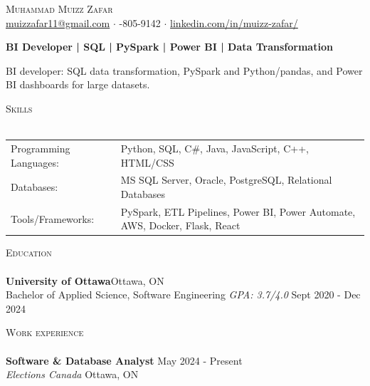 \documentclass[a4paper]{article}
\newcommand{\lineunder} {
    \vspace*{-8pt} \\
    \hspace*{-18pt} \hrulefill \\
}
\newcommand{\header} [1] {
    {\hspace*{-18pt}\vspace*{6pt} \textsc{#1}}
    \vspace*{-6pt} \lineunder
}
\begin{document}
\vspace*{-40pt}
\vspace*{-10pt}
\begin{center}
	{\Huge \scshape {Muhammad Muizz Zafar}}\\
	\faSend \space \href{mailto:muizzafar11@gmail.com}{muizzafar11@gmail.com} $\cdot$ \faPhoneSquare {}-805-9142 $\cdot$ \faLinkedinSquare \space \href{https://www.linkedin.com/in/muizz-zafar/}{linkedin.com/in/muizz-zafar/}
	\\
\end{center}
\vspace{-5pt}
\begin{center}
\textbf{BI Developer | SQL | PySpark | Power BI | Data Transformation}
\end{center}
\begin{center}
BI developer: SQL data transformation, PySpark and Python/pandas, and Power BI dashboards for large datasets.
\end{center}
\header{Skills}
\begin{tabular}{ l l }
	Programming Languages:        & Python, SQL, C\#, Java, JavaScript, C++, HTML/CSS \\
	Databases:                    & MS SQL Server, Oracle, PostgreSQL, Relational Databases \\
	Tools/Frameworks:             & PySpark, ETL Pipelines, Power BI, Power Automate, AWS, Docker, Flask, React \\
\end{tabular}
\vspace{2mm}
\header{Education}
\textbf{University of Ottawa}\hfill Ottawa, ON\\
Bachelor of Applied Science, Software Engineering \textit{GPA: 3.7/4.0} \hfill Sept 2020 - Dec 2024\\
\vspace{2mm}
\header{Work experience}
\vspace{1.5mm}
\textbf{Software \& Database Analyst} \hfill May 2024 - Present\\
\textit{Elections Canada} \hfill Ottawa, ON\\
\vspace{-2mm}
\end{document}
